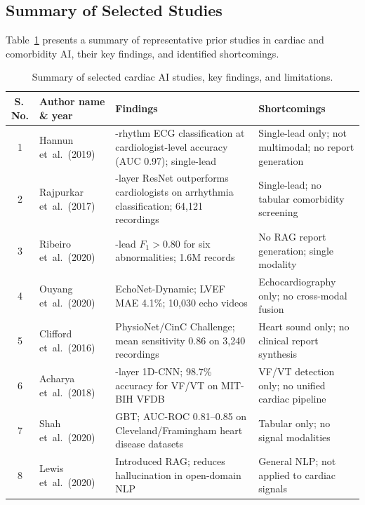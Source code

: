 \documentclass[AMA,STIX1COL,]{WileyNJD-v2}
\begin{document}
\subsection{Summary of Selected Studies}

Table~\ref{tab:related_summary} presents a summary of representative
prior studies in cardiac and comorbidity AI, their key findings, and
identified shortcomings.

\begin{table}[!ht]
\caption{Summary of selected cardiac AI studies, key findings, and limitations.}
\label{tab:related_summary}
\centering
\renewcommand{\arraystretch}{1.15}
\begin{tabular}{c>{\raggedright\arraybackslash}p{2.8cm}>{\raggedright\arraybackslash}p{4.5cm}>{\raggedright\arraybackslash}p{4.5cm}}
\toprule
\textbf{S.\,No.} & \textbf{Author name \& year} & \textbf{Findings} & \textbf{Shortcomings}\\
\midrule
1 & Hannun et~al.\ (2019)~\cite{hannun2019}
  & 12-rhythm ECG classification at cardiologist-level accuracy (AUC 0.97); single-lead
  & Single-lead only; not multimodal; no report generation\\
2 & Rajpurkar et~al.\ (2017)~\cite{rajpurkar2017}
  & 34-layer ResNet outperforms cardiologists on arrhythmia classification; 64,121 recordings
  & Single-lead; no tabular comorbidity screening\\
3 & Ribeiro et~al.\ (2020)~\cite{ribeiro2020}
  & 12-lead $F_1{>}0.80$ for six abnormalities; 1.6M records
  & No RAG report generation; single modality\\
4 & Ouyang et~al.\ (2020)~\cite{ouyang2020}
  & EchoNet-Dynamic; LVEF MAE 4.1\%; 10,030 echo videos
  & Echocardiography only; no cross-modal fusion\\
5 & Clifford et~al.\ (2016)~\cite{clifford2016}
  & PhysioNet/CinC Challenge; mean sensitivity 0.86 on 3,240 recordings
  & Heart sound only; no clinical report synthesis\\
6 & Acharya et~al.\ (2018)~\cite{acharya2018}
  & 13-layer 1D-CNN; 98.7\% accuracy for VF/VT on MIT-BIH VFDB
  & VF/VT detection only; no unified cardiac pipeline\\
7 & Shah et~al.\ (2020)~\cite{shah2020}
  & GBT; AUC-ROC 0.81--0.85 on Cleveland/Framingham heart disease datasets
  & Tabular only; no signal modalities\\
8 & Lewis et~al.\ (2020)~\cite{lewis2020}
  & Introduced RAG; reduces hallucination in open-domain NLP
  & General NLP; not applied to cardiac signals\\

\end{tabular}
\end{table}
\end{document}
